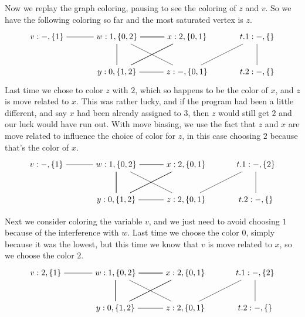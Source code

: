 \documentclass[11pt]{book}
\begin{document}
Now we replay the graph coloring, pausing to see the coloring of $z$
and $v$. So we have the following coloring so far and the most
saturated vertex is $z$.
\[
\begin{tikzpicture}[baseline=(current  bounding  box.center)]
\node (v) at (0,0)    {$v:-,\{1\}$};
\node (w) at (3,0)    {$w:1,\{0,2\}$};
\node (x) at (6,0)    {$x:2,\{0,1\}$};
\node (y) at (3,-1.5) {$y:0,\{1,2\}$};
\node (z) at (6,-1.5) {$z:-,\{0,1\}$};
\node (t1) at (9,0)   {$t.1:-,\{\}$};
\node (t2) at (9,-1.5) {$t.2:-,\{\}$};
\draw (t1) to (z);
\draw (t2) to (t1);
\draw (v) to (w);
\foreach \i in {w,x,y}
{
  \foreach \j in {w,x,y}
  {
    \draw (\i) to (\j);
  }
}
\draw (z) to (w);
\draw (z) to (y);
\end{tikzpicture}
\]
Last time we chose to color $z$ with $2$, which so happens to be the
color of $x$, and $z$ is move related to $x$. This was rather lucky,
and if the program had been a little different, and say $x$ had been
already assigned to $3$, then $z$ would still get $2$ and our luck
would have run out. With move biasing, we use the fact that $z$ and
$x$ are move related to influence the choice of color for $z$, in this
case choosing $2$ because that's the color of $x$.
\[
\begin{tikzpicture}[baseline=(current  bounding  box.center)]
\node (v) at (0,0)    {$v:-,\{1\}$};
\node (w) at (3,0)    {$w:1,\{0,2\}$};
\node (x) at (6,0)    {$x:2,\{0,1\}$};
\node (y) at (3,-1.5) {$y:0,\{1,2\}$};
\node (z) at (6,-1.5) {$z:2,\{0,1\}$};
\node (t1) at (9,0)   {$t.1:-,\{2\}$};
\node (t2) at (9,-1.5) {$t.2:-,\{\}$};
\draw (t1) to (z);
\draw (t2) to (t1);
\draw (v) to (w);
\foreach \i in {w,x,y}
{
  \foreach \j in {w,x,y}
  {
    \draw (\i) to (\j);
  }
}
\draw (z) to (w);
\draw (z) to (y);
\end{tikzpicture}
\]

Next we consider coloring the variable $v$, and we just need to avoid
choosing $1$ because of the interference with $w$. Last time we choose
the color $0$, simply because it was the lowest, but this time we know
that $v$ is move related to $x$, so we choose the color $2$.
\[
\begin{tikzpicture}[baseline=(current  bounding  box.center)]
\node (v) at (0,0)    {$v:2,\{1\}$};
\node (w) at (3,0)    {$w:1,\{0,2\}$};
\node (x) at (6,0)    {$x:2,\{0,1\}$};
\node (y) at (3,-1.5) {$y:0,\{1,2\}$};
\node (z) at (6,-1.5) {$z:2,\{0,1\}$};
\node (t1) at (9,0)   {$t.1:-,\{2\}$};
\node (t2) at (9,-1.5) {$t.2:-,\{\}$};
\draw (t1) to (z);
\draw (t2) to (t1);
\draw (v) to (w);
\foreach \i in {w,x,y}
{
  \foreach \j in {w,x,y}
  {
    \draw (\i) to (\j);
  }
}
\draw (z) to (w);
\draw (z) to (y);
\end{tikzpicture}
\]
\end{document}

